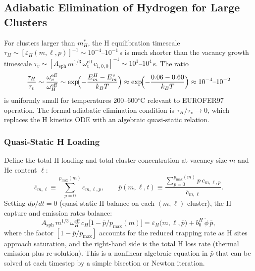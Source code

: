\documentclass[pdflatex,sn-basic]{sn-jnl} %
\begin{document}
\subsection{Adiabatic Elimination of Hydrogen for Large Clusters}
\label{sec:H_adiabatic}

For clusters larger than $m_H^*$, the H equilibration timescale
$\tau_H \sim [\varepsilon_H(m,\ell,p)]^{-1} \sim 10^{-4}$--$10^{-1}$\,s
is much shorter than the vacancy growth timescale
$\tau_v \sim [A_{\mathrm{sph}}\,m^{1/3}\,\omega_v^{\mathrm{eff}}\,c_{1,0,0}]^{-1}
\sim 10^1$--$10^4$\,s.  The ratio
\begin{equation}\label{eq:H_timescale_ratio}
    \frac{\tau_H}{\tau_v}
    \sim \frac{\omega_v^{\mathrm{eff}}}{\omega_H^{\mathrm{eff}}}
    \sim \exp\!\Bigl(-\frac{E_m^H - E_m^v}{k_BT}\Bigr)
    \approx \exp\!\Bigl(-\frac{0.06 - 0.60}{k_BT}\Bigr)
    \approx 10^{-4}\text{--}10^{-2}
\end{equation}
is uniformly small for temperatures 200--600$^\circ$C relevant to
EUROFER97 operation.  The formal adiabatic elimination condition is
$\tau_H / \tau_v \to 0$, which replaces the H kinetics ODE with an
algebraic quasi-static relation.

\subsubsection{Quasi-Static H Loading}
\label{sec:H_qss}

Define the total H loading and total cluster concentration at vacancy
size $m$ and He content $\ell$:
\begin{equation}
    \bar{c}_{m,\ell} \equiv \sum_{p=0}^{p_{\max}(m)} c_{m,\ell,p},
    \qquad
    \bar{p}(m,\ell,t)
    \equiv \frac{\displaystyle\sum_{p=0}^{p_{\max}(m)} p\,c_{m,\ell,p}}
               {\bar{c}_{m,\ell}}.
\end{equation}
Setting $d\bar{p}/dt = 0$ (quasi-static H balance on each
$(m,\ell)$ cluster), the H capture and emission rates balance:
\begin{equation}\label{eq:H_qss}
    A_{\mathrm{sph}}\,m^{1/3}\,\omega_H^{\mathrm{eff}}\,c_H
    \bigl[1 - \bar{p}/p_{\max}(m)\bigr]
    = \varepsilon_H\bigl(m,\ell,\bar{p}\bigr)
    + b_0^H\,\dot{\phi}\,\bar{p},
\end{equation}
where the factor $[1 - \bar{p}/p_{\max}]$ accounts for the reduced
trapping rate as H sites approach saturation, and the right-hand side
is the total H loss rate (thermal emission plus re-solution).  This is
a nonlinear algebraic equation in $\bar{p}$ that can be solved at each
timestep by a simple bisection or Newton iteration.
\end{document}
